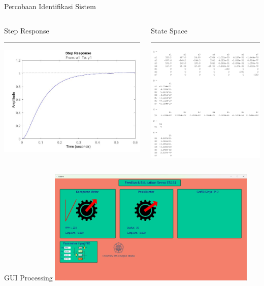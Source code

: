 \documentclass[10pt,xcolor={dvipsnames}]{beamer}
\begin{document}
\begin{frame}{Percobaan Identifikasi Sistem}
	\begin{columns}[T] %
		\begin{column}{0.48\textwidth}
			Step Response
			\color{black}\rule{\linewidth}{4pt}
			\includegraphics[width=7.5cm]{Coba Sistem Identification/tf1.jpg}
		\end{column}%
		\hfill%
		\begin{column}{0.48\textwidth}
			State Space
			\color{blue}\rule{\linewidth}{4pt}
			\begin{center}
				\includegraphics[width=6cm]{Coba Sistem Identification/ss1.png}
			\end{center}
		\end{column}
	\end{columns}
\end{frame}

\begin{frame}{GUI Processing}
	\centering
	\includegraphics[width=10cm]{Gambar Lain/guiprocessing.jpeg}
\end{frame}
\end{document}
